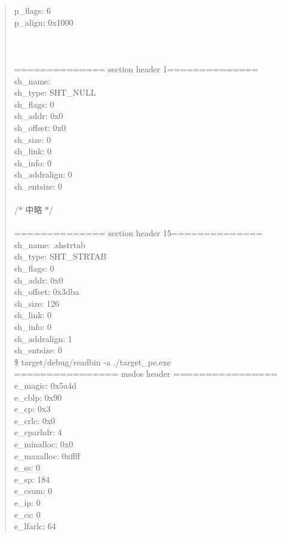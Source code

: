 \documentclass[12pt,a4paper,dvipdfmx]{jsarticle}
\begin{document}
\begin{quote}
p\_flags:	6 \\
p\_align:	0x1000 \\
 \\
 \\
 \\
============== section header 1============== \\
sh\_name:	 \\
sh\_type:	SHT\_NULL \\
sh\_flags:	0 \\
sh\_addr:	0x0 \\
sh\_offset:	0x0 \\
sh\_size:	0 \\
sh\_link:	0 \\
sh\_info:	0 \\
sh\_addralign:	0 \\
sh\_entsize:	0 \\
 \\
/* 中略 */ \\
 \\
============== section header 15============== \\
sh\_name:	.shstrtab \\
sh\_type:	SHT\_STRTAB \\
sh\_flags:	0 \\
sh\_addr:	0x0 \\
sh\_offset:	0x3dba \\
sh\_size:	126 \\
sh\_link:	0 \\
sh\_info:	0 \\
sh\_addralign:	1 \\
sh\_entsize:	0 \\
\$ target/debug/readbin -a ./target\_pe.exe \\
================ msdos header ================ \\
e\_magic:	0x5a4d \\
e\_cblp:		0x90 \\
e\_cp:		0x3 \\
e\_crlc:		0x0 \\
e\_cparhdr:	4 \\
e\_minalloc:	0x0 \\
e\_maxalloc:	0xffff \\
e\_ss:		0 \\
e\_sp:		184 \\
e\_csum:		0 \\
e\_ip:		0 \\
e\_cs:		0 \\
e\_lfarlc:	64 \\

\end{quote}
\end{document}
